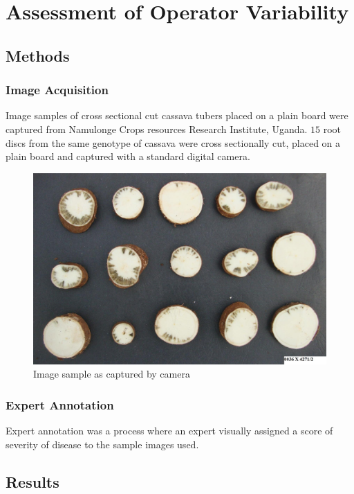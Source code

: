 \documentclass[conference]{IEEEtran}
\begin{document}



\section{Assessment of Operator Variability}
\subsection{Methods}
\subsubsection{Image Acquisition}
Image samples of cross sectional cut cassava tubers placed on a plain board were captured from Namulonge Crops resources Research Institute, Uganda. $15$ root discs from the same genotype of cassava were cross sectionally cut, placed on a plain board and captured with a standard digital camera.

\begin{figure}[t!]
\centering
\includegraphics[scale=0.15]{images/cassava1.jpg}
\caption{Image sample as captured by camera}
\label{fig:figure3}
\end{figure}

\subsubsection{Expert Annotation}
Expert annotation was a process where an expert visually assigned a score of severity of disease to the sample images used.
\subsection{Results}
\end{document}
